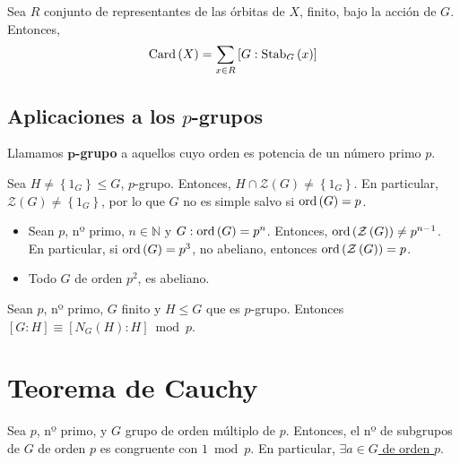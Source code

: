     \begin{coro}
    Sea $R$ conjunto de representantes de las órbitas de $X$, finito, bajo la acción de $G$. Entonces,
    \[
    \operatorname{Card}\left( X \right) = \sum_{x \in R} \left[ G : \mathrm{Stab}_G\left( x \right) \right] 
    \]
    \end{coro}

\subsection{Aplicaciones a los \texorpdfstring{$p$}{p}-grupos}
    \begin{defi}
        Llamamos $\mathbf{p}$\textbf{-grupo} a aquellos cuyo orden es potencia de un número primo $p$.
    \end{defi}

    \begin{lema}
        Sea $H \neq \left\{ 1_G \right\} \le G$, $p$-grupo. Entonces, $H \cap \mathcal{Z}\left( G \right) \neq \left\{ 1_G \right\}$. En particular, $\mathcal{Z}\left( G \right) \neq \left\{ 1_G \right\}$, por lo que $G$ no es simple salvo si $\operatorname{ord}\left( G \right) = p$.
    \end{lema}

    \begin{lema}
        \begin{itemize}
        \item Sean $p$, nº primo, $n \in \mathbb{N}$ y $G: \operatorname{ord}\left( G \right) = p^n$. Entonces, $\operatorname{ord} \left( \mathcal{Z}\left( G \right) \right) \neq p^{n-1}$. En particular, si $\operatorname{ord}\left( G \right) = p^3$, no abeliano, entonces $\operatorname{ord}\left( \mathcal{Z}\left( G \right) \right) = p$.

        \item Todo $G$ de orden $p^2$, es abeliano.
        \end{itemize} 
    \end{lema}

    \begin{lema}
        Sean $p$, nº primo, $G$ finito y $H \le G$ que es $p$-grupo. Entonces $\left[ G : H \right] \equiv \left[ N_G\left( H \right) : H \right] \bmod p$.
    \end{lema}

\section{Teorema de Cauchy}
    \begin{theo}[de Cauchy]
        Sea $p$, nº primo, y $G$ grupo de orden múltiplo de $p$. Entonces, el nº de subgrupos de $G$ de orden $p$ es congruente con $1 \bmod p$. En particular, \underline{$\exists a \in G$ de orden $p$}. 
    \end{theo}
